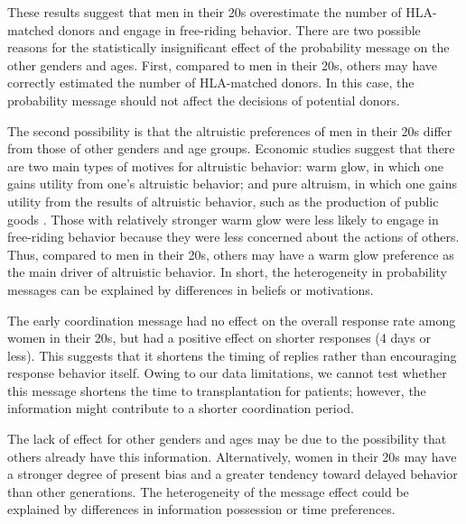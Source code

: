 \documentclass[
  11pt,
  a4paper
]{article}
\begin{document}
These results suggest that men in their 20s overestimate the number of HLA-matched donors and engage in free-riding behavior. There are two possible reasons for the statistically insignificant effect of the probability message on the other genders and ages. First, compared to men in their 20s, others may have correctly estimated the number of HLA-matched donors. In this case, the probability message should not affect the decisions of potential donors.

The second possibility is that the altruistic preferences of men in their 20s differ from those of other genders and age groups. Economic studies suggest that there are two main types of motives for altruistic behavior: warm glow, in which one gains utility from one's altruistic behavior; and pure altruism, in which one gains utility from the results of altruistic behavior, such as the production of public goods \citep{Andreoni1990}. Those with relatively stronger warm glow were less likely to engage in free-riding behavior because they were less concerned about the actions of others. Thus, compared to men in their 20s, others may have a warm glow preference as the main driver of altruistic behavior. In short, the heterogeneity in probability messages can be explained by differences in beliefs or motivations.

The early coordination message had no effect on the overall response rate among women in their 20s, but had a positive effect on shorter responses (4 days or less). This suggests that it shortens the timing of replies rather than encouraging response behavior itself. Owing to our data limitations, we cannot test whether this message shortens the time to transplantation for patients; however, the information might contribute to a shorter coordination period.

The lack of effect for other genders and ages may be due to the possibility that others already have this information. Alternatively, women in their 20s may have a stronger degree of present bias and a greater tendency toward delayed behavior than other generations. The heterogeneity of the message effect could be explained by differences in information possession or time preferences.
\end{document}

